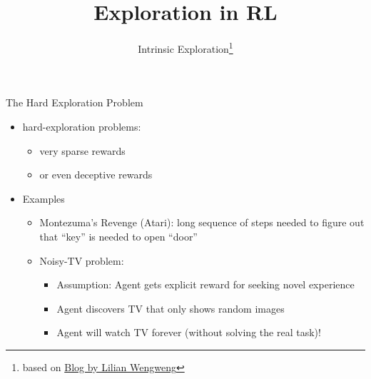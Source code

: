 


\title[RL: Exploration]{Exploration in RL}
\subtitle{Intrinsic Exploration\footnote{based on \href{https://lilianweng.github.io/lil-log/2020/06/07/exploration-strategies-in-deep-reinforcement-learning.html}{Blog by Lilian Wengweng}}}




	
	\maketitle

\begin{frame}[c]{The Hard Exploration Problem}
	
	\begin{itemize}
		\item hard-exploration problems:
		\begin{itemize}
			\item very sparse rewards 
			\item or even deceptive rewards
		\end{itemize}
		\medskip
		\pause
		\item Examples
		\begin{itemize}
			\item Montezuma's Revenge (Atari): long sequence of steps needed to figure out that ``key'' is needed to open ``door''
			\item Noisy-TV problem: 
			\begin{itemize}
				\item Assumption: Agent gets explicit reward for seeking novel experience
				\item Agent discovers TV that only shows random images
				\item Agent will watch TV forever (without solving the real task)!
			\end{itemize}
		\end{itemize}
	\end{itemize}

\end{frame}
